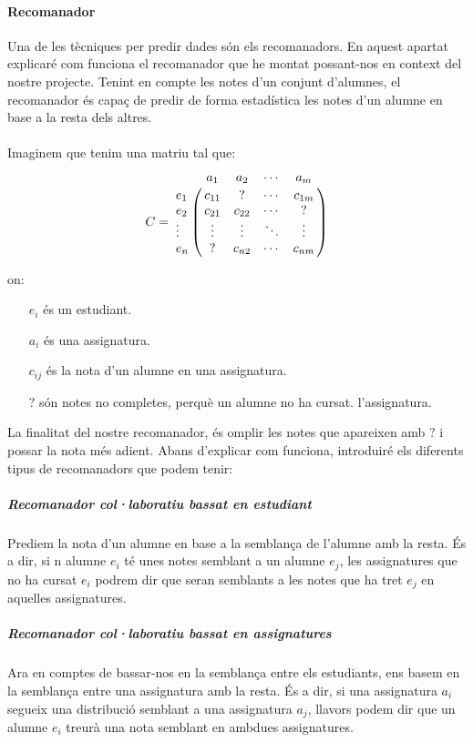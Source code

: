 \documentclass[12pt,a4paper,catalan]{article}
\begin{document}
\paragraph{Recomanador}
Una de les tècniques per predir dades són els recomanadors. En aquest apartat explicaré com funciona el recomanador que he montat possant-nos en context del nostre projecte. Tenint en compte les notes d'un conjunt d'alumnes, el recomanador és capaç de predir de forma estadística les notes d'un alumne en base a la resta dels altres.
\\
\\
Imaginem que tenim una matriu tal que:
$$
C = \bordermatrix{~ &         a_1   &    a_2   &   \cdots    &    a_m  \cr
                  e_1    &  c_{11}  &     ?    &   \cdots    &  c_{1m} \cr
                  e_2    &  c_{21}  &  c_{22}  &   \cdots    &    ?    \cr
                  \vdots &  \vdots  &  \vdots  &   \ddots    &  \vdots \cr
                  e_n    &    ?     &  c_{n2}  &   \cdots    &  c_{nm} \cr
                  }
$$

on:
\begin{itemize}[leftmargin=.5in]
	\item [$e_i$] és un estudiant.
	\item [$a_i$] és una assignatura.
	\item [$c_{ij}$] és la nota d'un alumne en una assignatura.
	\item [$?$] són notes no completes, perquè un alumne no ha cursat. l'assignatura.
\end{itemize}

La finalitat del nostre recomanador, és omplir les notes que apareixen amb $?$ i possar la nota més adient. Abans d'explicar com funciona, introduiré els diferents tipus de recomanadors que podem tenir:

\subparagraph{Recomanador col·laboratiu bassat en estudiant}
Prediem la nota d'un alumne en base a la semblança de l'alumne amb la resta. És a dir, si n alumne $e_i$ té unes notes semblant a un alumne $e_j$, les assignatures que no ha cursat $e_i$ podrem dir que seran semblants a les notes que ha tret $e_j$ en aquelles assignatures.

\subparagraph{Recomanador col·laboratiu bassat en assignatures}
Ara en comptes de bassar-nos en la semblança entre els estudiants, ens basem en la semblança entre una assignatura amb la resta. És a dir, si una assignatura $a_i$ segueix una distribució semblant a una assignatura $a_j$, llavors podem dir que un alumne $e_i$ treurà una nota semblant en ambdues assignatures.
\end{document}
